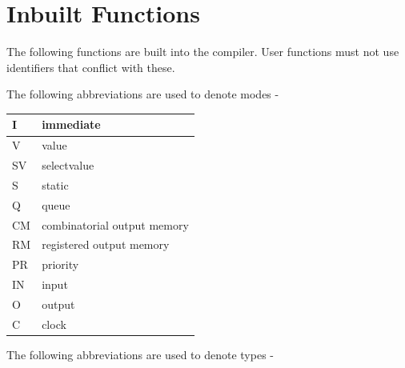 \pagebreak

\chapter{Inbuilt Functions}

    The following functions are built into the compiler. User functions must
    not use identifiers that conflict with these.
    
    The following abbreviations are used to denote modes -

    \begin{tabular}{| l | l |}
    \hline
    I  & immediate                      \\ \hline
    V  & value                          \\ \hline
    SV & selectvalue                    \\ \hline
    S  & static                         \\ \hline
    Q  & queue                          \\ \hline
    CM & combinatorial output memory    \\ \hline
    RM & registered output memory       \\ \hline
    PR & priority                       \\ \hline
    IN & input                          \\ \hline
    O  & output                         \\ \hline
    C  & clock                          \\ \hline
    \end{tabular}
    
    The following abbreviations are used to denote types -

